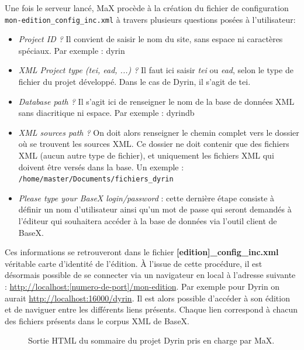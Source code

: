 \documentclass[a4paper,12pt,twoside]{book}
\begin{document}
Une fois le serveur lancé, MaX procède à la création du fichier de configuration \texttt{mon-edition\_config\_inc.xml}\label{config} à travers plusieurs questions posées à l'utilisateur:
\begin{itemize}
    \item \textit{Project ID ?} Il convient de saisir le nom du site, sans espace ni caractères spéciaux. Par exemple : dyrin
    \item \textit{XML Project type (tei, ead, ...) ?} Il faut ici saisir \textit{tei} ou \textit{ead}, selon le type de fichier du projet développé. Dans le cas de Dyrin, il s'agit de \og tei\fg.
    \item \textit{Database path ? }Il s'agit ici de renseigner le nom de la base de données XML sans diacritique ni espace. Par exemple : dyrindb
    \item \textit{XML sources path ?} On doit alors renseigner le chemin complet vers le dossier où se trouvent les sources XML. Ce dossier ne doit contenir que des fichiers XML (aucun autre type de fichier), et uniquement les fichiers XML qui doivent être versés dans la base. Un exemple : \texttt{/home/master/Documents/fichiers\_dyrin}
    \item \textit{Please type your BaseX login/password} : cette dernière étape consiste à définir un nom d'utilisateur ainsi qu'un mot de passe qui seront demandés à l'éditeur qui souhaitera accéder à la base de données via l'outil client de BaseX.
\end{itemize}

Ces informations se retrouveront dans le fichier \textbf{[edition]\_config\_inc.xml} véritable carte d'identité de l'édition. À l'issue de cette procédure, il est désormais possible de se connecter via un navigateur en local à l'adresse suivante : \url{http://localhost:[numero-de-port]/mon-edition}. Par exemple pour Dyrin on aurait \url{http://localhost:16000/dyrin}. Il est alors possible d'accéder à son édition et de naviguer entre les différents liens présents. Chaque lien correspond à chacun des fichiers présents dans le corpus XML de BaseX.

\begin{figure}[H]
  \centering
    \caption{Sortie \acrshort{HTML} du sommaire du projet Dyrin pris en charge par MaX.}
\end{figure}
\end{document}
